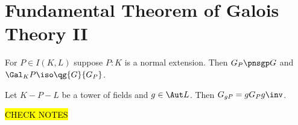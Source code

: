 \documentclass[a4paper]{article}
\begin{document}
\section{Fundamental Theorem of Galois Theory II}
\begin{ttheorem}
  For \( P\in I(K,L) \) suppose \( P:K \) is a normal extension.
  Then \( G_P\pnsgp G \) and \( \Gal_K P \iso \qg{G}{G_P} \).
\end{ttheorem}

\begin{tlemma}
  Let \( K-P-L \) be a tower of fields and \( g\in \Aut L \).
  Then \( G_{gP} = gG_Pg\inv \).
\end{tlemma}


\hl{CHECK NOTES}

\end{document}
